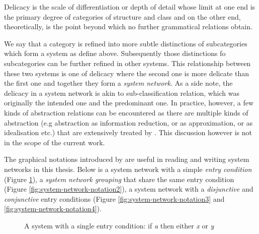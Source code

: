 \begin{definition}[Delicacy]\label{def:delicacy-sydney}
	Delicacy is the scale of differentiation or depth of detail whose limit at one end is the primary degree of categories of structure  and class and on the other end, theoretically, is the point beyond which no further grammatical relations obtain. \citet[58]{Halliday2002}  
\end{definition}

We say that a category is refined into more subtle distinctions of subcategories which form a system as define above. Subsequently those distinctions fo subcategories can be further refined in other systems. This relationship between these two systems is one of delicacy where the second one is more delicate than the first one and together they form a \textit{system network}. As a side note, the delicacy in a system network is akin to sub-classification relation, which was originally the intended one and the predominant one. In practice, however, a few kinds of abstraction relations can be encountered as there are multiple kinds of abstraction (e.g abstraction as information reduction, or as approximation, or as idealisation etc.) that are extensively treated by \citet{Saitta2013}. This discussion however is not in the scope of the current work.

The graphical notations introduced by \citet{Halliday2013} are useful in reading and writing system networks in this thesis. Below is a system network with a simple \textit{entry condition} (Figure \ref{fig:system-network-notation1}), a \textit{system network grouping} that share the same entry condition (Figure \ref{fig:system-network-notation2}), a system network with a \textit{disjunctive} and \textit{conjunctive} entry conditions (Figure \ref{fig:system-network-notation3} and \ref{fig:system-network-notation4}). 
\begin{figure}[H]
    \centering
    \caption{A system with a single entry condition: if \textit{a} then either \textit{x} or \textit{y}}
    \label{fig:system-network-notation1}
\end{figure}

